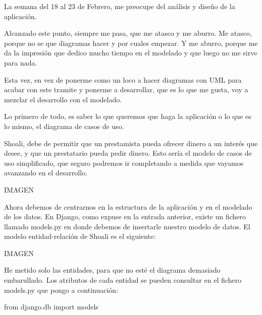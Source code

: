 \documentclass[a4paper, 12pt]{book}
\begin{document}
La semana del 18 al 23 de Febrero, me preocupe del análisis y diseño de la aplicación.

Alcanzado este punto, siempre me pasa, que me atasco y me aburro. Me atasco, porque no se que diagramas hacer y por cuales empezar. Y me aburro, porque me da la impresión que dedico mucho tiempo en el modelado y que luego no me sirve para nada.

Esta vez, en vez de ponerme como un loco a hacer diagramas con UML para acabar con este tramite y ponerme a desarrollar, que es lo que me gusta, voy  a mezclar el desarrollo con el modelado.

Lo primero de todo, es saber lo que queremos que haga la aplicación o lo que es lo mismo, el diagrama de casos de uso.

Shoali, debe de permitir que un prestamista pueda ofrecer dinero a un interés que desee, y que un prestatario pueda pedir dinero. Esto sería el modelo de casos de uso simplificado, que seguro podremos ir completando a medida que vayamos avanzando en el desarrollo.


IMAGEN

Ahora debemos de centrarnos en la estructura de la aplicación y en el modelado de los datos. En Django, como expuse en la entrada anterior, existe un fichero llamado models.py en donde debemos de insertarle nuestro modelo de datos. El modelo entidad-relación de Shoali es el siguiente:

IMAGEN

He metido solo las entidades, para que no esté el diagrama demasiado embarullado. Los atributos de cada entidad se pueden consultar en el fichero models.py que pongo a continuación:

from django.db import models
 
\end{document}

